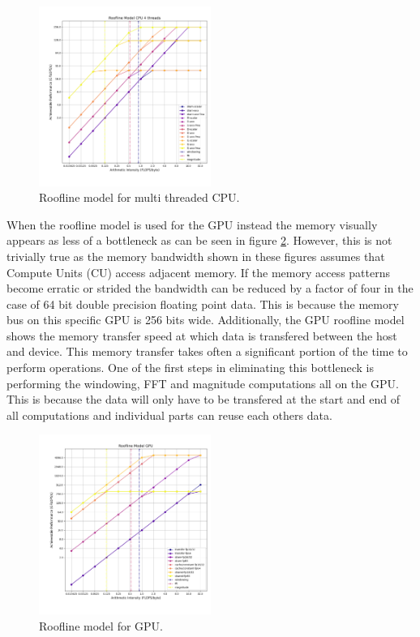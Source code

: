 \documentclass[conference]{IEEEtran}
\begin{document}
\begin{center}
	\begin{figure}[H]
		\includegraphics[width=0.5\textwidth]{resources/images/roof-mt4-cpu.png}
		\captionsetup{justification=centering}
		\caption{Roofline model for multi threaded CPU.}
		\label{fig:mtroofline}
	\end{figure}
\end{center}

When the roofline model is used for the GPU instead the memory visually appears
as less of a bottleneck as can be seen in figure \ref{fig:gpuroofline}.
However, this is not trivially true as the memory bandwidth shown in these
figures assumes that Compute Units (CU) access adjacent memory. If the memory
access patterns become erratic or strided the bandwidth can be reduced by a
factor of four in the case of 64 bit double precision floating point data. This
is because the memory bus on this specific GPU is 256 bits wide. Additionally,
the GPU roofline model shows the memory transfer speed at which data is
transfered between the host and device. This memory transfer takes often a
significant portion of the time to perform operations. One of the first steps
in eliminating this bottleneck is performing the windowing, FFT and magnitude
computations all on the GPU. This is because the data will only have to be
transfered at the start and end of all computations and individual parts can
reuse each others data.

\begin{center}
	\begin{figure}[H]
		\includegraphics[width=0.5\textwidth]{resources/images/roof-gpu.png}
		\captionsetup{justification=centering}
		\caption{Roofline model for GPU.}
		\label{fig:gpuroofline}
	\end{figure}
\end{center}
\end{document}
